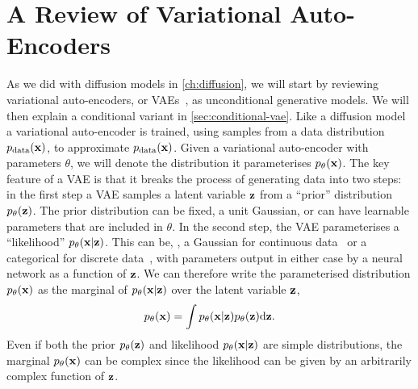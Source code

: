 \section{A Review of Variational Auto-Encoders}
\label{sec:vae}
As we did with diffusion models in \cref{ch:diffusion}, we will start by reviewing variational auto-encoders, or VAEs~\citep{kingma2013auto,rezende2014stochastic}, as unconditional generative models. We will then explain a conditional variant in \cref{sec:conditional-vae}. Like a diffusion model a variational auto-encoder is trained, using samples from a data distribution $p_{\rm{data}}({\mathbf{x}})$, to approximate $p_{\rm{data}}({\mathbf{x}})$. Given a variational auto-encoder with parameters $\theta$, we will denote the distribution it parameterises $p_\theta({\mathbf{x}})$. The key feature of a VAE is that it breaks the process of generating data into two steps: in the first step a VAE samples a latent variable ${\mathbf{z}}$ from a ``prior'' distribution $p_\theta({\mathbf{z}})$. The prior distribution can be fixed, \eg a unit Gaussian, or can have learnable parameters that are included in $\theta$. In the second step, the VAE parameterises a ``likelihood'' $p_\theta({\mathbf{x}}|{\mathbf{z}})$. This can be, \eg, a Gaussian for continuous data~\citep{kingma2013auto} or a categorical for discrete data~\citep{child2020very}, with parameters output in either case by a neural network as a function of ${\mathbf{z}}$. We can therefore write the parameterised distribution $p_\theta({\mathbf{x}})$ as the marginal of $p_\theta({\mathbf{x}}|{\mathbf{z}})$ over the latent variable ${\mathbf{z}}$,
\begin{equation} \label{eq:vae-marginal}
p_\theta({\mathbf{x}}) = \int p_\theta({\mathbf{x}}|{\mathbf{z}})p_\theta({\mathbf{z}}) \mathrm{d}{\mathbf{z}}.
\end{equation}
Even if both the prior $p_\theta({\mathbf{z}})$ and likelihood $p_\theta({\mathbf{x}}|{\mathbf{z}})$ are simple distributions, the marginal $p_\theta({\mathbf{x}})$ can be complex since the likelihood can be given by an arbitrarily complex function of ${\mathbf{z}}$.

